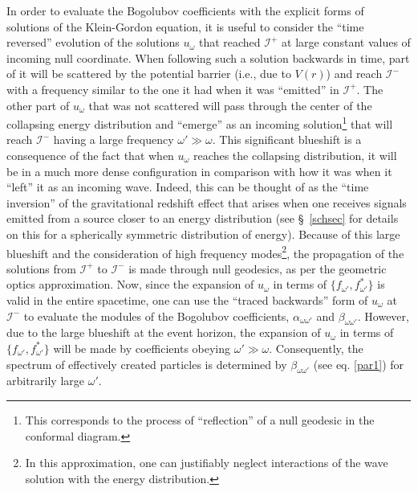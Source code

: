\documentclass[
12pt,		%
openright,	%
twoside,  %
a4paper,			%
chapter=TITLE,		%
english,			%
french,				%
spanish,			%
brazil				%
]{USPSC-classe/USPSC}
\begin{document}
In order to evaluate the Bogolubov coefficients with the explicit forms of solutions of the Klein-Gordon equation, it is useful to consider the ``time reversed'' evolution of the solutions $u_{\omega}$ that reached $\mathscr{I}^+$ at large constant values of incoming null coordinate. When following such a solution backwards in time, part of it will be scattered by the potential barrier (i.e., due to $V(r)$) and reach $\mathscr{I}^-$ with a frequency similar to the one it had when it was ``emitted'' in $\mathscr{I}^+$. The other part of $u_{\omega}$ that was not scattered will pass through the center of the collapsing energy distribution and ``emerge'' as an incoming solution\footnote{This corresponds to the process of ``reflection'' of a null geodesic in the conformal diagram. } that will reach $\mathscr{I}^-$ having a large frequency $\omega'\gg\omega$. This significant blueshift is a consequence of the fact that when $u_{\omega}$ reaches the collapsing distribution, it will be in a much more dense configuration in comparison with how it was when it ``left'' it as an incoming wave. Indeed, this can be thought of as the ``time inversion'' of the gravitational redshift effect that arises when one receives signals emitted from a source closer to an energy distribution (see \S~\ref{schsec} for details on this for a spherically symmetric distribution of energy). Because of this large blueshift and the consideration of high frequency modes\footnote{In this approximation, one can justifiably neglect interactions of the wave solution with the energy distribution.}, the propagation of the solutions from $\mathscr{I}^+$ to $\mathscr{I}^-$ is made through null geodesics, as per the geometric optics approximation. Now, since the expansion of $u_{\omega}$ in terms of $\{f_{\omega'},f_{\omega'}^*\}$ is valid in the entire spacetime, one can use the ``traced backwards'' form of $u_{\omega}$ at $\mathscr{I}^-$ to evaluate the modules of the Bogolubov coefficients, $\alpha_{\omega\omega'}$ and $\beta_{\omega\omega'}$. However, due to the large blueshift at the event horizon, the expansion of $u_{\omega}$ in terms of $\{f_{\omega'},f_{\omega'}^*\}$ will be made by coefficients obeying $\omega'\gg\omega$. Consequently, the spectrum of effectively created particles is determined by $\beta_{\omega\omega'}$ (see eq. \ref{par1}) for arbitrarily large $\omega'$.  
\end{document}
